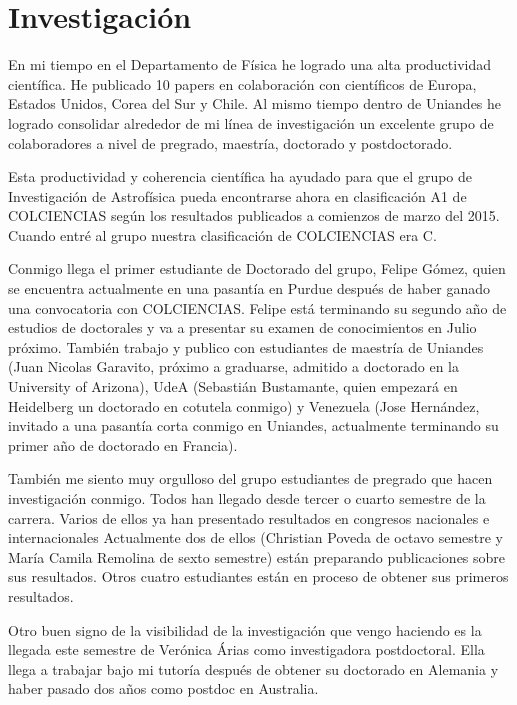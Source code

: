 \documentclass[letterpaper,12pt,onecolumn]{article}
\begin{document}
\pagestyle{empty}
\section*{{\Large{\sc Investigaci\'on}}}

En mi tiempo en el Departamento de F\'isica he logrado una alta
productividad cient\'ifica. He publicado 10 papers en colaboraci\'on
con cient\'ificos de Europa, Estados Unidos, Corea del Sur y Chile. Al
mismo tiempo dentro de Uniandes he logrado consolidar alrededor de mi
l\'inea de investigaci\'on un excelente grupo de colaboradores a nivel de
pregrado, maestr\'ia, doctorado y postdoctorado. 

Esta productividad y coherencia cient\'ifica ha ayudado para que el grupo de
Investigaci\'on de Astrof\'isica pueda encontrarse ahora en clasificaci\'on
A1 de COLCIENCIAS seg\'un los resultados publicados a comienzos de marzo del
2015. Cuando entr\'e al grupo nuestra clasificaci\'on de COLCIENCIAS era C.   

Conmigo llega el primer estudiante de Doctorado del grupo, Felipe
G\'omez, quien se encuentra actualmente en una pasant\'ia en Purdue
despu\'es de haber ganado una convocatoria con COLCIENCIAS. Felipe
est\'a terminando su segundo a\~no de estudios de doctorales y va a
presentar su examen de conocimientos en Julio pr\'oximo. Tambi\'en
trabajo y publico con estudiantes de maestr\'ia de Uniandes (Juan
Nicolas Garavito, pr\'oximo a graduarse, admitido a doctorado en la
University of Arizona), UdeA (Sebasti\'an
Bustamante, quien empezar\'a en Heidelberg un doctorado en cotutela conmigo)
y Venezuela (Jose Hern\'andez, invitado a una pasant\'ia corta conmigo
en Uniandes, actualmente terminando su primer a\~no de doctorado en
Francia).   

Tambi\'en me siento muy orgulloso del grupo estudiantes de pregrado que
hacen investigaci\'on conmigo. Todos han llegado desde tercer o cuarto
semestre de la carrera. Varios de ellos ya han presentado resultados
en congresos nacionales e internacionales Actualmente dos de ellos
(Christian Poveda de octavo semestre y Mar\'ia Camila Remolina de
sexto semestre) est\'an preparando publicaciones sobre sus
resultados. Otros cuatro estudiantes est\'an en proceso de obtener sus
primeros resultados.  

Otro buen signo de la visibilidad de la investigaci\'on que vengo
haciendo es la llegada este semestre de Ver\'onica \'Arias como 
investigadora postdoctoral. Ella llega a trabajar bajo mi
tutor\'ia despu\'es de obtener su doctorado en Alemania y haber pasado
dos a\~nos como postdoc en Australia. 
\end{document}

